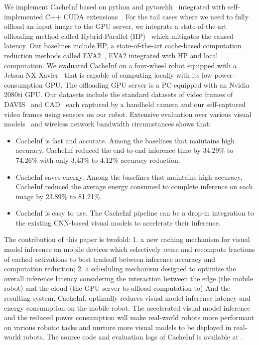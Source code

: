 We implement CacheInf based on python and pytorchh~\cite{paszke2017automatic} integrated with self-implemented C++ CUDA extensions~\cite{cuda}.
For the tail cases where we need to fully offload an input image to the GPU server, we integrate a state-of-the-art offloading method called Hybrid-Parallel (HP)~\cite{sun2024hybridparallel} which mitigates the caused latency.
Our baselines include HP, a state-of-the-art cache-based computation reduction methods called EVA2~\cite{buckler_eva_2018}, EVA2 integrated with HP and local computation.
We evaluated CacheInf on a four-wheel robot equipped with a Jetson NX Xavier~\cite{jetsonnx} that is capable of computing locally with its low-power-consumption GPU.
The offloading GPU server is a PC equipped with an Nvidia 2080ti GPU.
Our datasets include the standard datasets of video frames of DAVIS~\cite{Perazzi2016} and CAD~\cite{Choi_VSWS_2009} each captured by a handheld camera and our self-captured video frames using sensors on our robot.
Extensive evaluation over various visual models~\cite{kapao,agrnav,noauthor_torchvision_nodate} and wireless network bandwidth circumstances shows that:
\begin{itemize}
    \item CacheInf is fast and accurate. Among the baselines that maintains high accuracy, CacheInf reduced the end-to-end inference time by 34.29\% to 74.26\% with only 3.43\% to 4.12\% accuracy reduction.
    \item CacheInf saves energy. Among the baselines that maintains high accuracy, CacheInf reduced the average energy consumed to complete inference on each image by 23.89\% to 81.21\%.
    \item CacheInf is easy to use. The CacheInf pipeline can be a drop-in integration to the existing CNN-based visual models to accelerate their inference.
\end{itemize}

The contribution of this paper is twofold: 1. a new caching mechanism for visual model inference on mobile devices which selectively reuse and recompute fractions of cached activations to best tradeoff between inference accuracy and computation reduction; 2. a scheduling mechanism designed to optimize the overall inference latency considering the interaction between the edge (the mobile robot) and the cloud (the GPU server to offload computation to)
And the resulting system, CacheInf, optimally reduces visual model inference latency and energy consumption on the mobile robot.
The accelerated visual model inference and the reduced power consumption will make real-world robots more performant on various robotic tasks and nurture more visual models to be deployed in real-world robots.
The source code and evaluation logs of CacheInf is available at .


